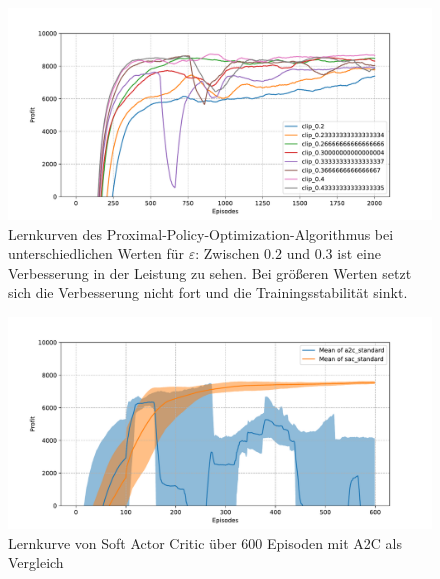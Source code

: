 \begin{figure}[htb]
	\centering
	\includegraphics[width=\textwidth]{appendix/ppo_different_clipping.pdf}
	\caption{
		Lernkurven des Proximal-Policy-Optimization-Algorithmus bei unterschiedlichen Werten für $\varepsilon$:
		Zwischen $0.2$ und $0.3$ ist eine Verbesserung in der Leistung zu sehen.
		Bei größeren Werten setzt sich die Verbesserung nicht fort und die Trainingsstabilität sinkt.
	}
	\label{graphic:PPODifferentClipping}
\end{figure}
\begin{figure}[htb]
	\centering
	\includegraphics[width=\textwidth]{appendix/a2c_vs_sac.pdf}
	\caption{Lernkurve von Soft Actor Critic über 600 Episoden mit A2C als Vergleich}
	\label{graphic:SACvsA2CLearningCurve}
\end{figure}
